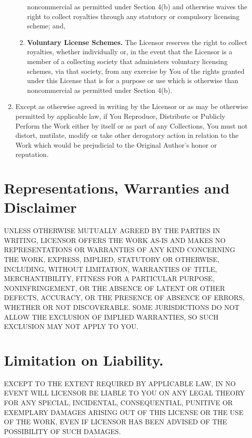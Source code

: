 \begin{enumerate}
\begin{enumerate}
              noncommercial as permitted under Section 4(b) and
              otherwise waives the right to collect royalties through
              any statutory or compulsory licensing scheme; and,
        \item \textbf{Voluntary License Schemes.} The Licensor reserves
              the right to collect royalties, whether individually or,
              in the event that the Licensor is a member of a collecting
              society that administers voluntary licensing schemes, via
              that society, from any exercise by You of the rights
              granted under this License that is for a purpose or use
              which is otherwise than noncommercial as permitted under
              Section 4(b).
       \end{enumerate}
 \item Except as otherwise agreed in writing by the Licensor or as may
       be otherwise permitted by applicable law, if You Reproduce,
       Distribute or Publicly Perform the Work either by itself or as
       part of any Collections, You must not distort, mutilate, modify
       or take other derogatory action in relation to the Work which
       would be prejudicial to the Original Author’s honor or
       reputation.
\end{enumerate}


\section{Representations, Warranties and Disclaimer}
UNLESS OTHERWISE MUTUALLY AGREED BY THE PARTIES IN WRITING, LICENSOR
OFFERS THE WORK AS-IS AND MAKES NO REPRESENTATIONS OR WARRANTIES OF ANY
KIND CONCERNING THE WORK, EXPRESS, IMPLIED, STATUTORY OR OTHERWISE,
INCLUDING, WITHOUT LIMITATION, WARRANTIES OF TITLE, MERCHANTIBILITY,
FITNESS FOR A PARTICULAR PURPOSE, NONINFRINGEMENT, OR THE ABSENCE OF
LATENT OR OTHER DEFECTS, ACCURACY, OR THE PRESENCE OF ABSENCE OF ERRORS,
WHETHER OR NOT DISCOVERABLE. SOME JURISDICTIONS DO NOT ALLOW THE
EXCLUSION OF IMPLIED WARRANTIES, SO SUCH EXCLUSION MAY NOT APPLY TO YOU.


\section{Limitation on Liability.}
EXCEPT TO THE EXTENT REQUIRED BY APPLICABLE LAW, IN NO EVENT WILL
LICENSOR BE LIABLE TO YOU ON ANY LEGAL THEORY FOR ANY SPECIAL,
INCIDENTAL, CONSEQUENTIAL, PUNITIVE OR EXEMPLARY DAMAGES ARISING OUT OF
THIS LICENSE OR THE USE OF THE WORK, EVEN IF LICENSOR HAS BEEN ADVISED
OF THE POSSIBILITY OF SUCH DAMAGES.



